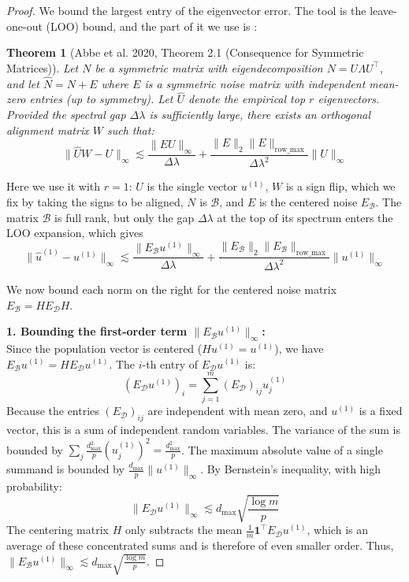 \documentclass[11pt]{article}
\newtheorem{theorem}{Theorem}
\begin{document}
\begin{proof}
We bound the largest entry of the eigenvector error. The tool is the leave-one-out (LOO) bound, and the part of it we use is \cite{abbe2020entrywise}:

\begin{theorem}[Abbe et al. 2020, Theorem 2.1 (Consequence for Symmetric Matrices)]
Let $N$ be a symmetric matrix with eigendecomposition $N = U \Lambda U^\top$, and let $\hat{N} = N + E$ where $E$ is a symmetric noise matrix with independent mean-zero entries (up to symmetry). Let $\hat{U}$ denote the empirical top $r$ eigenvectors. Provided the spectral gap $\Delta\lambda$ is sufficiently large, there exists an orthogonal alignment matrix $W$ such that:
\begin{equation}
\|\hat{U} W - U\|_\infty \lesssim \frac{\|E U\|_\infty}{\Delta\lambda} + \frac{\|E\|_2 \|E\|_{\text{row\_max}}}{\Delta\lambda^2} \|U\|_\infty
\end{equation}
\end{theorem}

Here we use it with $r=1$: $U$ is the single vector $u^{(1)}$, $W$ is a sign flip, which we fix by taking the signs to be aligned, $N$ is $\mathcal{B}$, and $E$ is the centered noise $E_{\mathcal{B}}$. The matrix $\mathcal{B}$ is full rank, but only the gap $\Delta\lambda$ at the top of its spectrum enters the LOO expansion, which gives
\begin{equation}
\|\hat{u}^{(1)} - u^{(1)}\|_\infty \lesssim \frac{\|E_{\mathcal{B}} u^{(1)}\|_\infty}{\Delta\lambda} + \frac{\|E_{\mathcal{B}}\|_2 \|E_{\mathcal{B}}\|_{\text{row\_max}}}{\Delta\lambda^2} \|u^{(1)}\|_\infty
\end{equation}

We now bound each norm on the right for the centered noise matrix $E_{\mathcal{B}} = H E_{\mathcal{D}} H$.

\textbf{1. Bounding the first-order term $\|E_{\mathcal{B}} u^{(1)}\|_\infty$:} \\
Since the population vector is centered ($H u^{(1)} = u^{(1)}$), we have $E_{\mathcal{B}} u^{(1)} = H E_{\mathcal{D}} u^{(1)}$. The $i$-th entry of $E_{\mathcal{D}} u^{(1)}$ is:
\begin{equation}
(E_{\mathcal{D}} u^{(1)})_i = \sum_{j=1}^m (E_{\mathcal{D}})_{ij} u^{(1)}_j
\end{equation}
Because the entries $(E_{\mathcal{D}})_{ij}$ are independent with mean zero, and $u^{(1)}$ is a fixed vector, this is a sum of independent random variables. The variance of the sum is bounded by $\sum_j \frac{d_{\max}^2}{p} (u^{(1)}_j)^2 = \frac{d_{\max}^2}{p}$. The maximum absolute value of a single summand is bounded by $\frac{d_{\max}}{p} \|u^{(1)}\|_\infty$. By Bernstein's inequality, with high probability:
\begin{equation}
\|E_{\mathcal{D}} u^{(1)}\|_\infty \lesssim d_{\max} \sqrt{\frac{\log m}{p}}
\end{equation}
The centering matrix $H$ only subtracts the mean $\frac{1}{m}\mathbf{1}^\top E_{\mathcal{D}} u^{(1)}$, which is an average of these concentrated sums and is therefore of even smaller order. Thus, $\|E_{\mathcal{B}} u^{(1)}\|_\infty \lesssim d_{\max} \sqrt{\frac{\log m}{p}}$.


\end{proof}
\end{document}

